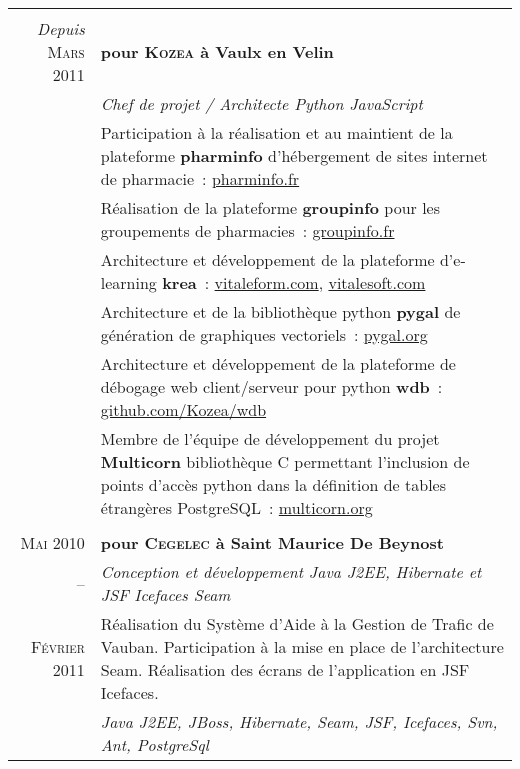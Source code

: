 \documentclass[a4paper,10pt]{article}
\begin{document}
\begin{supertabular}{r|p{11cm}}
   \\
  \emph{Depuis} \textsc{Mars 2011}  & \textbf{pour \textsc{Kozea} à Vaulx en Velin} \\
  & \emph{Chef de projet / Architecte Python JavaScript} \\
  & \footnotesize{Participation à la réalisation et au maintient de la plateforme \textbf{pharminfo} d’hébergement de sites internet de pharmacie : \href{http://www.pharminfo.fr}{pharminfo.fr}} \\
  & \footnotesize{Réalisation de la plateforme \textbf{groupinfo} pour les groupements de pharmacies : \href{http://www.groupinfo.fr}{groupinfo.fr}} \\
  & \footnotesize{Architecture et développement de la plateforme d’e-learning \textbf{krea} : \href{http://vitaleform.com}{vitaleform.com}, \href{http://vitalesoft.com}{vitalesoft.com}} \\
  & \footnotesize{Architecture et de la bibliothèque python \textbf{pygal} de génération de graphiques vectoriels : \href{http://pygal.org}{pygal.org}} \\
  & \footnotesize{Architecture et développement de la plateforme de débogage web client/serveur pour python \textbf{wdb} : \href{https://github.com/Kozea/wdb}{github.com/Kozea/wdb}} \\
  & \footnotesize{Membre de l’équipe de développement du projet \textbf{Multicorn} bibliothèque C permettant l’inclusion de points d'accès python dans la définition de tables étrangères PostgreSQL : \href{http://multicorn.org/}{multicorn.org}} \\


   \\
  \textsc{Mai 2010}  & \textbf{pour \textsc{Cegelec} à Saint Maurice De Beynost} \\
  -- & \emph{Conception et développement Java J2EE, Hibernate et JSF Icefaces Seam} \\
  \footnotesize{\textsc{Février 2011}} & \footnotesize{Réalisation du Système d’Aide à la Gestion de Trafic de Vauban. Participation à la mise en place de l’architecture Seam. Réalisation des écrans de l’application en JSF Icefaces.} \\
  & \emph{Java J2EE, JBoss, Hibernate, Seam, JSF, Icefaces, Svn, Ant, PostgreSql} \\



\end{supertabular}
\end{document}
